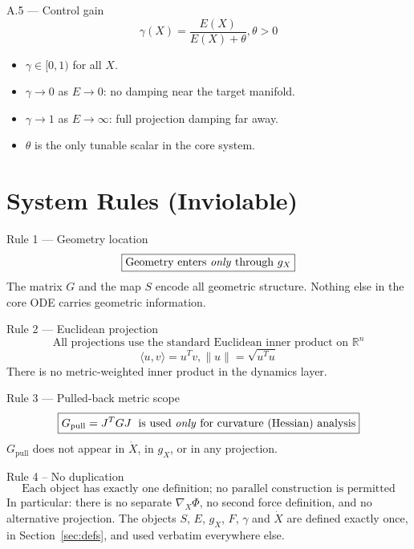 \documentclass[11pt,oneside]{amsart}
\def\qquad{ }%
\def\textbf#1{#1}%
\theoremstyle{plain}
\theoremstyle{definition}
\newcommand{\Xdot}{\dot{X}}
\newcommand{\gX}{g_X}
\newcommand{\Gpull}{G_{\mathrm{pull}}}
\newcommand{\R}{\mathbb{R}}
\begin{document}
\begin{defbox}{A.5 --- Control gain}
\[
\boxed{\gamma(X) = \frac{E(X)}{E(X) + \theta}, \qquad \theta > 0}
\]
\end{defbox}

\begin{itemize}[leftmargin=1.8em]
  \item $\gamma \in [0,1)$ for all $X$.
  \item $\gamma \to 0$ as $E \to 0$: no damping near the target manifold.
  \item $\gamma \to 1$ as $E \to \infty$: full projection damping far away.
  \item $\theta$ is the only tunable scalar in the core system.
\end{itemize}

\section{System Rules (Inviolable)}
\label{sec:rules}

\begin{rulebox}{Rule 1 --- Geometry location}
\[
\boxed{\text{Geometry enters \emph{only} through } \gX}
\]
The matrix $G$ and the map $S$ encode all geometric structure.
Nothing else in the core ODE carries geometric information.
\end{rulebox}

\vspace{6pt}

\begin{rulebox}{Rule 2 --- Euclidean projection}
\[
\boxed{\text{All projections use the standard Euclidean inner product on } \R^{n}}
\]
\[
  \langle u, v \rangle = u^{T} v, \qquad \|u\| = \sqrt{u^{T}u}
\]
There is no metric-weighted inner product in the dynamics layer.
\end{rulebox}

\vspace{6pt}

\begin{rulebox}{Rule 3 --- Pulled-back metric scope}
\[
\boxed{\Gpull = J^{T} G J \;\text{ is used \emph{only} for curvature (Hessian) analysis}}
\]
$\Gpull$ does \textbf{not} appear in $\Xdot$, in $\gX$, or in any projection.
\end{rulebox}

\vspace{6pt}
\begin{rulebox}{Rule 4 -- No duplication}
\[
\boxed{\text{Each object has exactly one definition; no parallel construction is permitted}}
\]
In particular: there is no separate $\nabla_{X}\Phi$, no second force
definition, and no alternative projection. The objects $S$, $E$, $\gX$,
$F$, $\gamma$ and $\Xdot$ are defined exactly once, in
Section~\ref{sec:defs}, and used verbatim everywhere else.
\end{rulebox}
\end{document}
